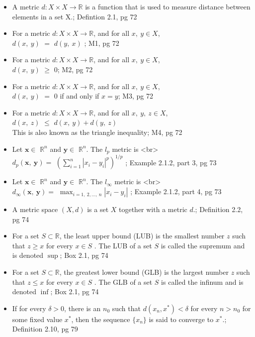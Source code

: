 \documentclass{article}
\begin{document}
\begin{multicols}{2}

\begin{itemize}
\item A metric $d: X \times X \rightarrow \mathbb{R}$ is a function that is used to measure distance between elements in a set X.; Defintion 2.1, pg 72
\item For a metric $d: X \times X \rightarrow \mathbb{R}$, and for all $x, \: y \in X$,\\
 $d(x, \: y) $  $=$  $d(y, \: x) $ ; M1, pg 72
\item For a metric $d: X \times X \rightarrow \mathbb{R}$, and for all $x, \: y \in X$,\\
$d(x, \: y) $ $\geq$  $0$; M2, pg 72
\item For a metric $d: X \times X \rightarrow \mathbb{R}$, and for all $x, \: y \in X$,\\
$d(x, \: y) $ $=$ $0$ if and only if $x = y$; M3, pg 72
\item For a metric $d: X \times X \rightarrow \mathbb{R}$, and for all $x, \: y, \: z \in X$,\\
$d(x, \: z) $ $\leq$ $d(x, \: y) + d(y, \: z)$\\
This is also known as the triangle inequality; M4, pg 72
\item Let $\mathbf{x} \in$ $\mathbb{R}^n$ and $\mathbf{y} \in$  $\mathbb{R}^n$. The $l_p$ metric is <br>\\
$d_p(\mathbf{x}, \: \mathbf{y}) = $  $ \left( \sum_{i=1}^n |x_i - y_i|^p \right)^{1/p}$ ; Example 2.1.2, part 3, pg 73
\item Let $\mathbf{x} \in$ $\mathbb{R}^n$ and $\mathbf{y} \in$ $\mathbb{R}^n$. The $l_{\infty}$ metric is <br>\\
$d_\infty(\mathbf{x}, \: \mathbf{y}) = $  $ \max_{i=1,\:2,\dots,\:n} |x_i - y_i| $ ; Example 2.1.2, part 4, pg 73
\item A metric space $(X, d)$ is a set $X$ together with a metric $d$.; Definition 2.2, pg 74
\item For a set $S \subset \mathbb{R}$, the least upper bound (LUB) is the smallest number $z$ such that $z \geq x$ for every $x \in S$ . The LUB of a set $S$ is called the supremum and is denoted $ \sup $; Box 2.1, pg 74
\item For a set $S \subset \mathbb{R}$, the greatest lower bound (GLB) is the largest number $z$ such that $z \leq x$ for every $x \in S$ . The GLB of a set $S$ is called the infinum and is denoted $ \inf $; Box 2.1, pg 74
\item If for every $\delta > 0$, there is an $n_0$ such that $d(x_n, x^*) < \delta$ for every $n > n_0$ for some fixed value $x^*$, then the sequence $\{x_n\}$ is said to converge to $x^*$.; Definition 2.10, pg 79

\end{itemize}
\end{multicols}
\end{document}

